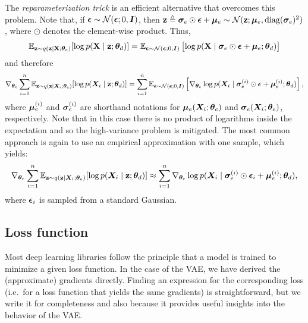 The \emph{reparameterization trick} is an efficient alternative that overcomes this problem. Note that, if ${\bm{\epsilon}} \sim \mathcal{N}({\bm{\epsilon}}; 0, {\bm{I}})$, then ${\mathbf{z}} \triangleq {\bm{\sigma}}_e \odot {\bm{\epsilon}} + {\bm{\mu}}_e \sim  \mathcal{N}({\mathbf{z}}; {\bm{\mu}}_e, \mathrm{diag}({\bm{\sigma}}_e)^2)$, where $\odot$ denotes the element-wise product. Thus,
\begin{equation}
    \mathbb{E}_{{\mathbf{z}} \sim q({\mathbf{z}} \mid {\mathbf{X}}; {\bm{\theta}}_e)} [\log p({\mathbf{X}} \mid {\mathbf{z}}; {\bm{\theta}}_d)] = \mathbb{E}_{{\bm{\epsilon}} \sim \mathcal{N}({\bm{\epsilon}}; 0, {\bm{I}})} \left[\log p({\mathbf{X}} \mid {\bm{\sigma}}_e \odot {\bm{\epsilon}} + {\bm{\mu}}_e; {\bm{\theta}}_d) \right]
\end{equation}
and therefore
\begin{equation}
    \nabla_{{\bm{\theta}}_e} \sum_{i=1}^n \mathbb{E}_{{\mathbf{z}} \sim q({\mathbf{z}} \mid {\bm{X}}_i; {\bm{\theta}}_e)} [\log p({\bm{X}}_i \mid {\mathbf{z}}; {\bm{\theta}}_d) ] = \sum_{i=1}^n \mathbb{E}_{{\bm{\epsilon}} \sim \mathcal{N}({\bm{\epsilon}}; 0, {\bm{I}})} \left[\nabla_{{\bm{\theta}}_e} \log p({\bm{X}}_i \mid {\bm{\sigma}}_e^{(i)} \odot {\bm{\epsilon}} + {\bm{\mu}}_e^{(i)}; {\bm{\theta}}_d)\right],
\end{equation}
where ${\bm{\mu}}_e^{(i)}$ and ${\bm{\sigma}}_e^{(i)}$ are shorthand notations for ${\bm{\mu}}_e({\bm{X}}_i; {\bm{\theta}}_e)$ and ${\bm{\sigma}}_e({\bm{X}}_i; {\bm{\theta}}_e)$, respectively. Note that in this case there is no product of logarithms inside the expectation and so the high-variance problem is mitigated. The most common approach is again to use an empirical approximation with one sample, which yields:
\begin{equation}
    \label{eq:vae_likelihood_encoder_grad}
    \nabla_{{\bm{\theta}}_e} \sum_{i=1}^n \mathbb{E}_{{\mathbf{z}} \sim q({\mathbf{z}} \mid {\bm{X}}_i; {\bm{\theta}}_e)} [\log p({\bm{X}}_i \mid {\mathbf{z}}; {\bm{\theta}}_d) ] \approx \sum_{i=1}^n \nabla_{{\bm{\theta}}_e} \log p({\bm{X}}_i \mid {\bm{\sigma}}_e^{(i)} \odot {\bm{\epsilon}}_i + {\bm{\mu}}_e^{(i)}; {\bm{\theta}}_d),
\end{equation}
where ${\bm{\epsilon}}_i$ is sampled from a standard Gaussian.

\subsection{Loss function}
Most deep learning libraries follow the principle that a model is trained to minimize a given loss function. In the case of the VAE, we have derived the (approximate) gradients directly. Finding an expression for the corresponding loss (i.e.\ for a loss function that yields the same gradients) is straightforward, but we write it for completeness and also because it provides useful insights into the behavior of the VAE.

